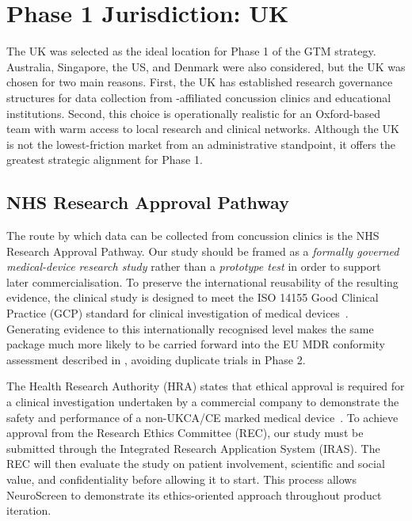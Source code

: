 \section{Phase 1 Jurisdiction: UK}
\label{sec:ent-regulatory-uk}

The UK was selected as the ideal location for Phase 1 of the GTM strategy. Australia, Singapore, the US, and Denmark were also considered, but the UK was chosen for two main reasons. First, the UK has established research governance structures for data collection from -affiliated concussion clinics and educational institutions. Second, this choice is operationally realistic for an Oxford-based team with warm access to local research and clinical networks. Although the UK is not the lowest-friction market from an administrative standpoint, it offers the greatest strategic alignment for Phase 1.

\subsection{NHS Research Approval Pathway}

The route by which data can be collected from concussion clinics is the NHS Research Approval Pathway. Our study should be framed as a \emph{formally governed medical-device research study} rather than a \emph{prototype test} in order to support later commercialisation. To preserve the international reusability of the resulting evidence, the clinical study is designed to meet the ISO 14155 Good Clinical Practice (GCP) standard for clinical investigation of medical devices~\cite{iso14155}. Generating evidence to this internationally recognised level makes the same package much more likely to be carried forward into the EU MDR conformity assessment described in , avoiding duplicate trials in Phase 2.

The Health Research Authority (HRA) states that ethical approval is required for a clinical investigation undertaken by a commercial company to demonstrate the safety and performance of a non-UKCA/CE marked medical device~\cite{hra_medical_devices}. To achieve approval from the Research Ethics Committee (REC), our study must be submitted through the Integrated Research Application System (IRAS). The REC will then evaluate the study on patient involvement, scientific and social value, and confidentiality before allowing it to start. This process allows NeuroScreen to demonstrate its ethics-oriented approach throughout product iteration.


